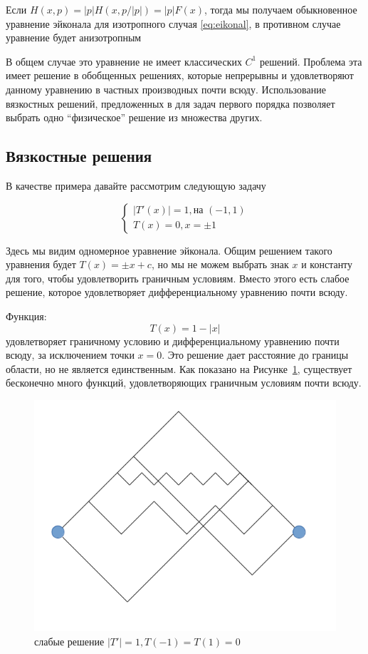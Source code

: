 Если $H(x,p) = |p| H(x,p/|p|) = |p| F(x)$, тогда мы получаем
обыкновенное уравнение эйконала для изотропного случая
\eqref{eq:eikonal}, в противном случае уравнение будет анизотропным

В общем случае это уравнение не имеет классических $C^1$
решений. Проблема эта имеет решение в обобщенных решениях, которые
непрерывны и удовлетворяют данному уравнению в частных производных
почти всюду. Использование вязкостных  решений, предложенных в
\cite{V1984,V1983} для задач первого порядка позволяет выбрать одно
``физическое'' решение из множества других. 

\subsection{Вязкостные решения}

В качестве примера давайте рассмотрим следующую задачу

\begin{equation}
  \label{eq:visc_sample}
  \left\{ \begin{matrix}
      |T'(x)| = 1,\text{на } (-1,1) \\
      T(x) = 0,x = \pm 1
    \end{matrix}\right.
\end{equation}

Здесь мы видим одномерное уравнение эйконала. Общим решением такого
уравнения будет $T(x) = \pm x + c$, но мы не можем выбрать знак $x$ и
константу для того, чтобы удовлетворить граничным условиям. Вместо
этого есть слабое решение, которое удовлетворяет дифференциальному
уравнению почти всюду.

Функция:
\begin{equation*}
  T(x) = 1 - |x|
\end{equation*}
удовлетворяет граничному условию и дифференциальному уравнению почти
всюду, за исключением точки $x = 0$. Это решение дает расстояние до
границы области, но не является единственным. Как показано на
Рисунке~\ref{fig:weak-sol}, существует бесконечно много функций,
удовлетворяющих граничным условиям почти всюду.

\begin{figure}[h]
  \centering
  \includegraphics[width=0.5\linewidth]{img/weak-sol.png}
  \hfil \caption{слабые решение $|T'|=1,T(-1)=T(1)=0$}
  \label{fig:weak-sol}

\end{figure}

